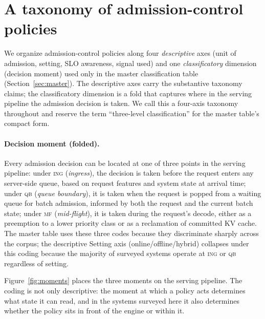\documentclass[10pt]{article} %
\theoremstyle{definition}
\begin{document}
\section{A taxonomy of admission-control policies}
\label{sec:taxonomy}

We organize admission-control policies along four \emph{descriptive}
axes (unit of admission, setting, SLO awareness, signal used) and one
\emph{classificatory} dimension (decision moment) used only in the
master classification table (Section~\ref{sec:master}). The
descriptive axes carry the substantive taxonomy claims; the
classificatory dimension is a fold that captures where in the
serving pipeline the admission decision is taken. We call this a
four-axis taxonomy throughout and reserve the term ``three-level
classification'' for the master table's compact form.

\paragraph{Decision moment (folded).} Every admission decision can
be located at one of three points in the serving pipeline:
under \textsc{ing} (\emph{ingress}), the decision is taken before the
request enters any server-side queue, based on request features and
system state at arrival time; under \textsc{qb} (\emph{queue
boundary}), it is taken when the request is popped from a waiting
queue for batch admission, informed by both the request and the
current batch state; under \textsc{mf} (\emph{mid-flight}), it is
taken during the request's decode, either as a preemption to a
lower priority class or as a reclamation of committed KV cache. The
master table uses these three codes because they discriminate
sharply across the corpus; the descriptive Setting axis
(online/offline/hybrid) collapses under this coding because the
majority of surveyed systems operate at \textsc{ing} or \textsc{qb}
regardless of setting.

Figure~\ref{fig:moments} places the three moments on the serving
pipeline. The coding is not only descriptive: the moment at which a
policy acts determines what state it can read, and in the systems
surveyed here it also determines whether the policy sits in front of
the engine or within it.
\end{document}
